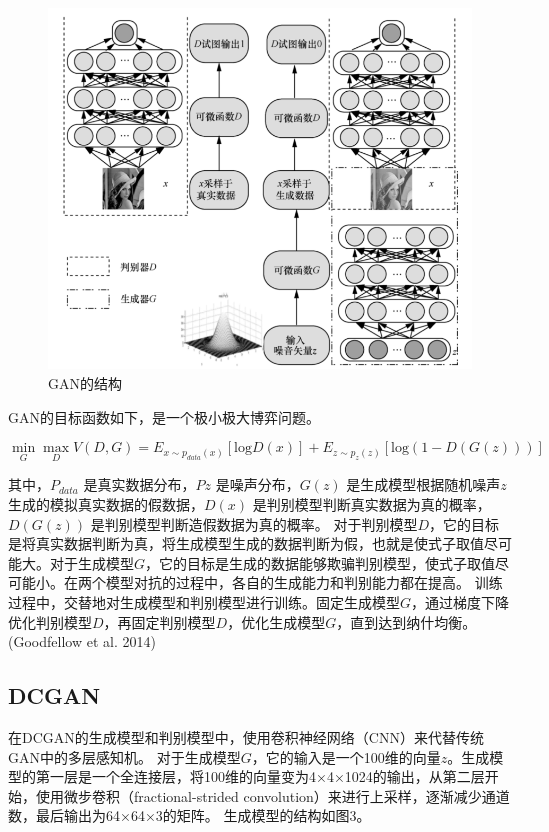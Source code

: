 \documentclass[hyperref, a4paper]{ctexart}
\begin{document}
\begin{figure}
\centering
\includegraphics{1.png}
\caption{GAN的结构}
\end{figure}

GAN的目标函数如下，是一个极小极大博弈问题。

\[\mathop{\min}\limits_{G} \mathop{\max}\limits_{D}\mathit{V(D,G)} = E_{x\sim p_{data}(x)}[ \mathrm{log} D(x)]+E_{z\sim p_z(z)}[ \mathrm{log}(1-D(G(z)))]\]

其中，\(P_{data}\) 是真实数据分布，\(Pz\) 是噪声分布，\(G(z)\)
是生成模型根据随机噪声\(z\)生成的模拟真实数据的假数据，\(D(x)\)
是判别模型判断真实数据为真的概率，\(D(G(z))\)
是判别模型判断造假数据为真的概率。
对于判别模型\(D\)，它的目标是将真实数据判断为真，将生成模型生成的数据判断为假，也就是使式子取值尽可能大。对于生成模型\(G\)，它的目标是生成的数据能够欺骗判别模型，使式子取值尽可能小。在两个模型对抗的过程中，各自的生成能力和判别能力都在提高。
训练过程中，交替地对生成模型和判别模型进行训练。固定生成模型\(G\)，通过梯度下降优化判别模型\(D\)，再固定判别模型\(D\)，优化生成模型\(G\)，直到达到纳什均衡。(Goodfellow
et al. 2014)

\hypertarget{dcgan}{%
\subsection{DCGAN}\label{dcgan}}

在DCGAN的生成模型和判别模型中，使用卷积神经网络（CNN）来代替传统GAN中的多层感知机。
对于生成模型\(G\)，它的输入是一个100维的向量\(z\)。生成模型的第一层是一个全连接层，将100维的向量变为4×4×1024的输出，从第二层开始，使用微步卷积（fractional-strided
convolution）来进行上采样，逐渐减少通道数，最后输出为64×64×3的矩阵。
生成模型的结构如图3。
\end{document}
